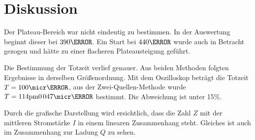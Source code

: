 \section{Diskussion}
\label{sec:Diskussion}
Der Plateau-Bereich war nicht eindeutig zu bestimmen.
In der Auswertung beginnt dieser bei $\si{390}{\volt}$.
Ein Start bei $\si{440}{\volt}$ wurde auch in Betracht gezogen und hätte zu einer flacheren Plateausteigung geführt.

Die Bestimmung der Totzeit verlief genauer.
Aus beiden Methoden folgten Ergebnisse in derselben Größenordnung.
Mit dem Oszilloskop beträgt die Totzeit $T= \si{100}{\micr\second}$, aus der Zwei-Quellen-Methode wurde $T= \si{114 \pm 0.047}{\micr\second}$ bestimmt.
Die Abweichung ist unter 15\%.

Durch die grafische Darstellung wird ersichtlich, dass die Zahl $Z$ mit der mittleren Stromstärke $I$ in einem linearen Zusammenhang steht.
Gleiches ist auch im Zusammenhang zur Ladung $Q$ zu sehen.